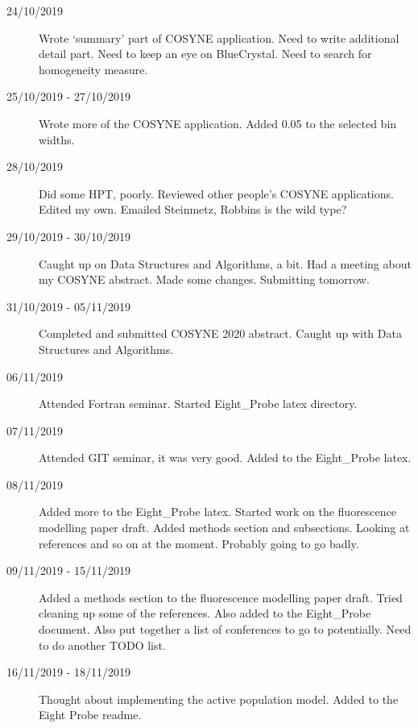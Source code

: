 \documentclass[a4paper,12pt]{article}
\theoremstyle{definition}
\begin{document}
\begin{description}
                                \item[24/10/2019] Wrote `summary' part of COSYNE application. Need to write additional detail part. Need to keep an eye on BlueCrystal. Need to search for homogeneity measure.

                                \item[25/10/2019 - 27/10/2019] Wrote more of the COSYNE application. Added 0.05 to the selected bin widths.

                                \item[28/10/2019] Did some HPT, poorly. Reviewed other people's COSYNE applications. Edited my own. Emailed Steinmetz, Robbins is the wild type?

                                \item[29/10/2019 - 30/10/2019] Caught up on Data Structures and Algorithms, a bit. Had a meeting about my COSYNE abstract. Made some changes. Submitting tomorrow.

                                \item[31/10/2019 - 05/11/2019] Completed and submitted COSYNE 2020 abstract. Caught up with Data Structures and Algorithms.

                                \item[06/11/2019] Attended Fortran seminar. Started Eight\_Probe latex directory.

                                \item[07/11/2019] Attended GIT seminar, it was very good. Added to the Eight\_Probe latex.

                                \item[08/11/2019] Added more to the Eight\_Probe latex. Started work on the fluorescence modelling paper draft. Added methods section and subsections. Looking at references and so on at the moment. Probably going to go badly.

                                \item[09/11/2019 - 15/11/2019] Added a methods section to the fluorescence modelling paper draft. Tried cleaning up some of the references. Also added to the Eight\_Probe document. Also put together a list of conferences to go to potentially. Need to do another TODO list.

                                \item[16/11/2019 - 18/11/2019] Thought about implementing the active population model. Added to the Eight Probe readme.


\end{description}
\end{document}
